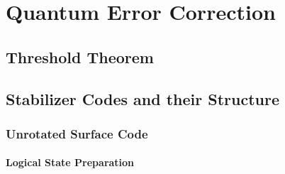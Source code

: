 \chapter{Quantum Error Correction}



\section{Threshold Theorem}



\section{Stabilizer Codes and their Structure}



\subsection{Unrotated Surface Code}



\subsubsection{Logical State Preparation}